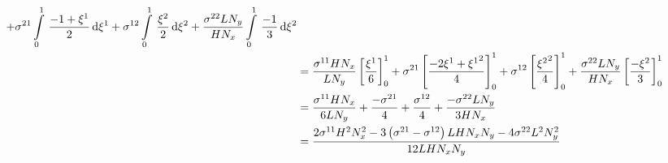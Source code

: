 \begin{equation}
\begin{aligned}
    +\conductivitytensorsymbol^{21}\gint{0}{1}{\dfrac{-1+\xione}{2}}{\xione}
    +\conductivitytensorsymbol^{12}\gint{0}{1}{\dfrac{\xitwo}{2}}{\xitwo}
    +\dfrac{\conductivitytensorsymbol^{22} L N_{y}}{H N_{x}}\gint{0}{1}{\dfrac{-1}{3}}{\xitwo} \\
    &=\dfrac{\conductivitytensorsymbol^{11} H N_{x}}{L N_{y}}\sqbrac{\dfrac{\xione}{6}}^{1}_{0}
    +\conductivitytensorsymbol^{21}\sqbrac{\dfrac{-2\xione+\xionesq}{4}}^{1}_{0}
    +\conductivitytensorsymbol^{12}\sqbrac{\dfrac{\xitwosq}{4}}^{1}_{0}
    +\dfrac{\conductivitytensorsymbol^{22} L N_{y}}{H N_{x}}\sqbrac{\dfrac{-\xitwo}{3}}^{1}_{0} \\
    &=\dfrac{\conductivitytensorsymbol^{11} H N_{x}}{6 L N_{y}}+\dfrac{-\conductivitytensorsymbol^{21}}{4}+
    \dfrac{\conductivitytensorsymbol^{12}}{4}+\dfrac{-\conductivitytensorsymbol^{22} L N_{y}}{3 H N_{x}} \\
    &=\dfrac{2\conductivitytensorsymbol^{11}H^{2}N_{x}^{2}-3\pbrac{\conductivitytensorsymbol^{21}-
        \conductivitytensorsymbol^{12}}L H N_{x} N_{y}-4\conductivitytensorsymbol^{22}L^{2}N_{y}^{2}}{12 L H N_{x} N_{y}}
  \end{aligned}
\end{equation}

